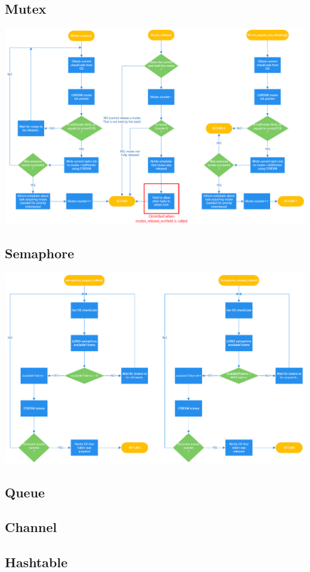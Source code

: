 \documentclass[12pt,a4paper]{article}
\begin{document}
\subsection{Mutex}
\includegraphics[width=1\textwidth]{images/Mutex.png}\\
\subsection{Semaphore}
\includegraphics[width=1\textwidth]{images/Semaphore.png}\\
\subsection{Queue}
\subsection{Channel}
\subsection{Hashtable}
\end{document}
